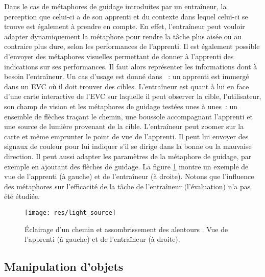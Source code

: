 \documentclass[11pt]{article}
\begin{document}
Dans le cas de métaphores de guidage introduites par un entraîneur, la perception que celui-ci a de son apprenti et du contexte dans lequel celui-ci se trouve est également à prendre en compte. En effet, l'entraîneur peut vouloir adapter dynamiquement la métaphore pour rendre la tâche plus aisée ou au contraire plus dure, selon les performances de l'apprenti. Il est également possible d'envoyer des métaphores visuelles permettant de donner à l'apprenti des indications sur ses performances. Il faut alors représenter les informations dont à besoin l'entraîneur. Un cas d'usage est donné dans \cite{guidage}~: un apprenti est immergé dans un EVC où il doit trouver des cibles. L'entraîneur est quant à lui en face d'une carte interactive de l'EVC sur laquelle il peut observer la cible, l'utilisateur, son champ de vision et les métaphores de guidage testées unes à unes~: un ensemble de flèches traçant le chemin, une boussole accompagnant l'apprenti et une source de lumière provenant de la cible. L'entraîneur peut zoomer sur la carte et même emprunter le point de vue de l'apprenti. Il peut lui envoyer des signaux de couleur pour lui indiquer s'il se dirige dans la bonne ou la mauvaise direction. Il peut aussi adapter les paramètres de la métaphore de guidage, par exemple en ajoutant des flèches de guidage. La figure \ref{fig:light-source} montre un exemple de vue de l'apprenti (à gauche) et de l'entraîneur (à droite). Notons que l'influence des métaphores sur l'efficacité de la tâche de l'entraîneur (l'évaluation) n'a pas été étudiée.

\begin{figure}
\centering
\texttt{[image: res/light\_source]}
\caption{\label{fig:light-source}Éclairage d'un chemin et assombrissement des alentours \cite{guidage}. Vue de l'apprenti (à gauche) et de l'entraîneur (à droite).}
\end{figure}

\subsection{Manipulation d'objets}
\label{subsec:manipulation}
\end{document}
